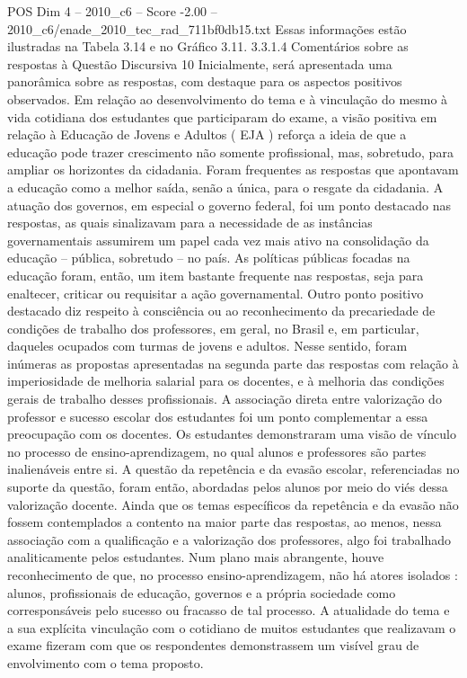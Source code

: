 \begin{textsample}{POS Dim 4 – 2010\_c6 – Score -2.00 – 2010\_c6/enade\_2010\_tec\_rad\_711bf0db15.txt}
Essas informações estão ilustradas na Tabela 3.14 e no Gráfico 3.11. 3.3.1.4 Comentários sobre as respostas à Questão Discursiva 10 Inicialmente, será apresentada uma panorâmica sobre as respostas, com destaque para os aspectos positivos observados.
Em relação ao desenvolvimento do tema e à vinculação do mesmo à vida cotidiana dos estudantes que participaram do exame, a visão positiva em relação à Educação de Jovens e Adultos ( EJA ) reforça a ideia de que a educação pode trazer crescimento não somente profissional, mas, sobretudo, para ampliar os horizontes da cidadania.
Foram frequentes as respostas que apontavam a educação como a melhor saída, senão a única, para o resgate da cidadania.
A atuação dos governos, em especial o governo federal, foi um ponto destacado nas respostas, as quais sinalizavam para a necessidade de as instâncias governamentais assumirem um papel cada vez mais ativo na consolidação da educação – pública, sobretudo – no país.
As políticas públicas focadas na educação foram, então, um item bastante frequente nas respostas, seja para enaltecer, criticar ou requisitar a ação governamental.
Outro ponto positivo destacado diz respeito à consciência ou ao reconhecimento da precariedade de condições de trabalho dos professores, em geral, no Brasil e, em particular, daqueles ocupados com turmas de jovens e adultos.
Nesse sentido, foram inúmeras as propostas apresentadas na segunda parte das respostas com relação à imperiosidade de melhoria salarial para os docentes, e à melhoria das condições gerais de trabalho desses profissionais.
A associação direta entre valorização do professor e sucesso escolar dos estudantes foi um ponto complementar a essa preocupação com os docentes.
Os estudantes demonstraram uma visão de vínculo no processo de ensino-aprendizagem, no qual alunos e professores são partes inalienáveis entre si.
A questão da repetência e da evasão escolar, referenciadas no suporte da questão, foram então, abordadas pelos alunos por meio do viés dessa valorização docente.
Ainda que os temas específicos da repetência e da evasão não fossem contemplados a contento na maior parte das respostas, ao menos, nessa associação com a qualificação e a valorização dos professores, algo foi trabalhado analiticamente pelos estudantes.
Num plano mais abrangente, houve reconhecimento de que, no processo ensino-aprendizagem, não há atores isolados : alunos, profissionais de educação, governos e a própria sociedade como corresponsáveis pelo sucesso ou fracasso de tal processo.
A atualidade do tema e a sua explícita vinculação com o cotidiano de muitos estudantes que realizavam o exame fizeram com que os respondentes demonstrassem um visível grau de envolvimento com o tema proposto.

\end{textsample}
